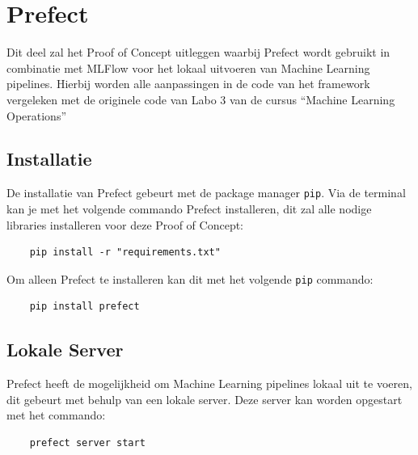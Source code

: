 \section{Prefect}
Dit deel zal het Proof of Concept uitleggen waarbij Prefect wordt gebruikt in combinatie met MLFlow voor het lokaal uitvoeren van Machine Learning pipelines. Hierbij worden alle aanpassingen in de code van het framework vergeleken met de originele code van Labo 3 van de cursus ``Machine Learning Operations''
\subsection{Installatie}
De installatie van Prefect gebeurt met de package manager \verb+pip+. Via de terminal kan je met het volgende commando Prefect installeren, dit zal alle nodige libraries installeren voor deze Proof of Concept:
\begin{verbatim}
    pip install -r "requirements.txt"
\end{verbatim}

Om alleen Prefect te installeren kan dit met het volgende \verb+pip+ commando:
\begin{verbatim}
    pip install prefect
\end{verbatim}

\subsection{Lokale Server}
Prefect heeft de mogelijkheid om Machine Learning pipelines lokaal uit te voeren, dit gebeurt met behulp van een lokale server. Deze server kan worden opgestart met het commando:
\begin{verbatim}
    prefect server start
\end{verbatim}

